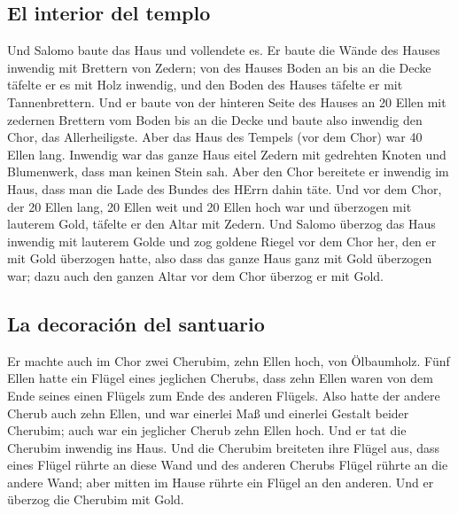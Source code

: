 \hypertarget{el-interior-del-templo}{%
\subsection{El interior del templo}\label{el-interior-del-templo}}

 Und Salomo baute das Haus und vollendete es.
 Er baute die Wände des Hauses inwendig mit Brettern von
Zedern; von des Hauses Boden an bis an die Decke täfelte er es mit Holz
inwendig, und den Boden des Hauses täfelte er mit Tannenbrettern.
 Und er baute von der hinteren Seite des Hauses an 20
Ellen mit zedernen Brettern vom Boden bis an die Decke und baute also
inwendig den Chor, das Allerheiligste.  Aber das Haus des
Tempels (vor dem Chor) war 40 Ellen lang.  Inwendig war
das ganze Haus eitel Zedern mit gedrehten Knoten und Blumenwerk, dass
man keinen Stein sah.  Aber den Chor bereitete er
inwendig im Haus, dass man die Lade des Bundes des HErrn dahin täte.
 Und vor dem Chor, der 20 Ellen lang, 20 Ellen weit und
20 Ellen hoch war und überzogen mit lauterem Gold, täfelte er den Altar
mit Zedern.  Und Salomo überzog das Haus inwendig mit
lauterem Golde und zog goldene Riegel vor dem Chor her, den er mit Gold
überzogen hatte,  also dass das ganze Haus ganz mit Gold
überzogen war; dazu auch den ganzen Altar vor dem Chor überzog er mit
Gold.

\hypertarget{la-decoraciuxf3n-del-santuario}{%
\subsection{La decoración del
santuario}\label{la-decoraciuxf3n-del-santuario}}

 Er machte auch im Chor zwei Cherubim, zehn Ellen hoch,
von Ölbaumholz.  Fünf Ellen hatte ein Flügel eines
jeglichen Cherubs, dass zehn Ellen waren von dem Ende seines einen
Flügels zum Ende des anderen Flügels.  Also hatte der
andere Cherub auch zehn Ellen, und war einerlei Maß und einerlei Gestalt
beider Cherubim;  auch war ein jeglicher Cherub zehn
Ellen hoch.  Und er tat die Cherubim inwendig ins Haus.
Und die Cherubim breiteten ihre Flügel aus, dass eines Flügel rührte an
diese Wand und des anderen Cherubs Flügel rührte an die andere Wand;
aber mitten im Hause rührte ein Flügel an den anderen. 
Und er überzog die Cherubim mit Gold.

